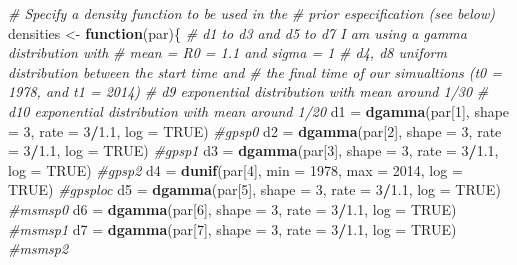 \documentclass[12pt,]{article}
\newenvironment{Shaded}{\begin{snugshade}}{\end{snugshade}}
\newcommand{\CommentTok}[1]{\textcolor[rgb]{0.56,0.35,0.01}{\textit{#1}}}
\newcommand{\ControlFlowTok}[1]{\textcolor[rgb]{0.13,0.29,0.53}{\textbf{#1}}}
\newcommand{\DataTypeTok}[1]{\textcolor[rgb]{0.13,0.29,0.53}{#1}}
\newcommand{\DecValTok}[1]{\textcolor[rgb]{0.00,0.00,0.81}{#1}}
\newcommand{\FloatTok}[1]{\textcolor[rgb]{0.00,0.00,0.81}{#1}}
\newcommand{\KeywordTok}[1]{\textcolor[rgb]{0.13,0.29,0.53}{\textbf{#1}}}
\newcommand{\NormalTok}[1]{#1}
\newcommand{\OperatorTok}[1]{\textcolor[rgb]{0.81,0.36,0.00}{\textbf{#1}}}
\newcommand{\OtherTok}[1]{\textcolor[rgb]{0.56,0.35,0.01}{#1}}
\newcommand{\StringTok}[1]{\textcolor[rgb]{0.31,0.60,0.02}{#1}}
\begin{document}
\begin{Shaded}
\begin{Highlighting}[]
\CommentTok{# Specify a density function to be used in the }
\CommentTok{# prior especification (see below)}
\NormalTok{densities <-}\StringTok{  }\ControlFlowTok{function}\NormalTok{(par)\{}
  \CommentTok{# d1 to d3 and d5 to d7 I am using a gamma distribution with }
  \CommentTok{#    mean = R0 = 1.1 and sigma = 1}
  \CommentTok{# d4, d8 uniform distribution between the start time and }
  \CommentTok{# the final time of our simualtions (t0 = 1978, and t1 = 2014)}
  \CommentTok{# d9 exponential distribution with mean around 1/30}
  \CommentTok{# d10 exponential distribution with mean around 1/20}
\NormalTok{  d1 =}\StringTok{ }\KeywordTok{dgamma}\NormalTok{(par[}\DecValTok{1}\NormalTok{], }\DataTypeTok{shape =} \DecValTok{3}\NormalTok{, }\DataTypeTok{rate =} \DecValTok{3}\OperatorTok{/}\FloatTok{1.1}\NormalTok{, }\DataTypeTok{log =} \OtherTok{TRUE}\NormalTok{) }\CommentTok{#gpsp0}
\NormalTok{  d2 =}\StringTok{ }\KeywordTok{dgamma}\NormalTok{(par[}\DecValTok{2}\NormalTok{], }\DataTypeTok{shape =} \DecValTok{3}\NormalTok{, }\DataTypeTok{rate =} \DecValTok{3}\OperatorTok{/}\FloatTok{1.1}\NormalTok{, }\DataTypeTok{log =} \OtherTok{TRUE}\NormalTok{) }\CommentTok{#gpsp1}
\NormalTok{  d3 =}\StringTok{ }\KeywordTok{dgamma}\NormalTok{(par[}\DecValTok{3}\NormalTok{], }\DataTypeTok{shape =} \DecValTok{3}\NormalTok{, }\DataTypeTok{rate =} \DecValTok{3}\OperatorTok{/}\FloatTok{1.1}\NormalTok{, }\DataTypeTok{log =} \OtherTok{TRUE}\NormalTok{) }\CommentTok{#gpsp2}
\NormalTok{  d4 =}\StringTok{ }\KeywordTok{dunif}\NormalTok{(par[}\DecValTok{4}\NormalTok{], }\DataTypeTok{min =} \DecValTok{1978}\NormalTok{, }\DataTypeTok{max =} \DecValTok{2014}\NormalTok{, }\DataTypeTok{log =} \OtherTok{TRUE}\NormalTok{) }\CommentTok{#gpsploc}
\NormalTok{  d5 =}\StringTok{ }\KeywordTok{dgamma}\NormalTok{(par[}\DecValTok{5}\NormalTok{], }\DataTypeTok{shape =} \DecValTok{3}\NormalTok{, }\DataTypeTok{rate =} \DecValTok{3}\OperatorTok{/}\FloatTok{1.1}\NormalTok{, }\DataTypeTok{log =} \OtherTok{TRUE}\NormalTok{) }\CommentTok{#msmsp0}
\NormalTok{  d6 =}\StringTok{ }\KeywordTok{dgamma}\NormalTok{(par[}\DecValTok{6}\NormalTok{], }\DataTypeTok{shape =} \DecValTok{3}\NormalTok{, }\DataTypeTok{rate =} \DecValTok{3}\OperatorTok{/}\FloatTok{1.1}\NormalTok{, }\DataTypeTok{log =} \OtherTok{TRUE}\NormalTok{) }\CommentTok{#msmsp1}
\NormalTok{  d7 =}\StringTok{ }\KeywordTok{dgamma}\NormalTok{(par[}\DecValTok{7}\NormalTok{], }\DataTypeTok{shape =} \DecValTok{3}\NormalTok{, }\DataTypeTok{rate =} \DecValTok{3}\OperatorTok{/}\FloatTok{1.1}\NormalTok{, }\DataTypeTok{log =} \OtherTok{TRUE}\NormalTok{) }\CommentTok{#msmsp2}

\end{Highlighting}
\end{Shaded}
\end{document}
